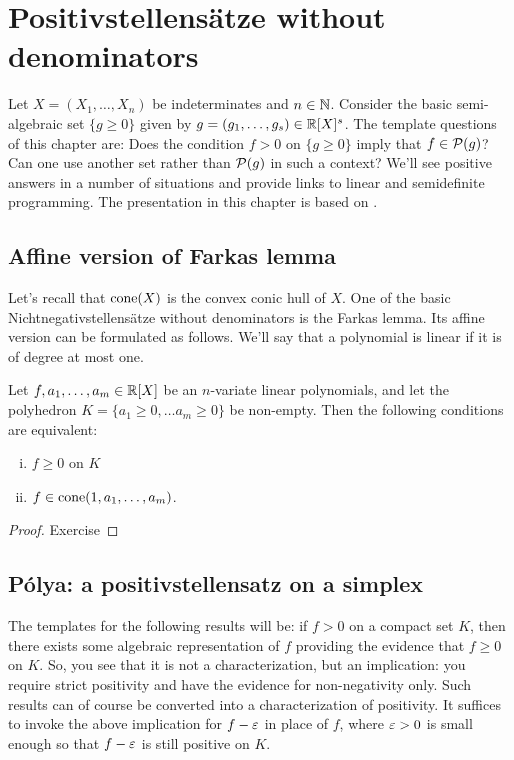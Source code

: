 \section{Positivstellensätze without denominators}

Let $X=(X_1,\ldots,X_n)$ be indeterminates and $n \in \mathbb{N}$. Consider the basic semi-algebraic set $\{g \ge 0\}$ given by $g =(g_1,\ldots,g_s) \in \mathbb{R}[X]^s$.  The template questions of this chapter are: Does the condition $f > 0$ on $\{g \ge 0\}$ imply that $f \in \mathcal{P}(g)$? Can one use another set rather than $\mathcal{P}(g)$ in such a context? We'll see positive answers in a number of situations and provide links to linear and semidefinite programming.
The presentation in this chapter is based on \cite{averkov2013constructive}.

\subsection{Affine version of Farkas lemma}

Let's recall that $\operatorname{cone}(X)$ is the convex conic hull of $X$. One of the basic Nichtnegativstellens\"atze without denominators is the Farkas lemma. Its affine version can be formulated as follows. We'll say that a polynomial is linear if it is of degree at most one. 

\begin{lemma}
	\label{lem:farkas}
	Let $f,a_1,\ldots,a_m \in \mathbb{R}[X]$ be an $n$-variate linear polynomials, and let the polyhedron $K = \{a_1 \ge 0,\ldots a_m \ge 0\}$ be non-empty.
	Then the following conditions are equivalent:
	\begin{enumerate}[(i)]
		\item $f \ge 0$ on $K$
		\item $f \in \operatorname{cone}(1,a_1,\ldots,a_m)$. 
	\end{enumerate}
\end{lemma}
\begin{proof}
	Exercise
\end{proof}


\subsection{P\'olya: a positivstellensatz on a simplex}

The templates for the following results will be: if $f > 0$ on a compact set $K$, then there exists some algebraic representation of $f$ providing the evidence that $f \ge 0$ on $K$. So, you see that it is not a characterization, but an implication: you require strict positivity and have the evidence for non-negativity only. Such results can of course be converted into a characterization of positivity. It suffices to invoke the above implication for $f - {\operatorname{\varepsilon}}$ in place of $f$, where ${\operatorname{\varepsilon}}>0$ is small enough so that $f - {\operatorname{\varepsilon}}$ is still positive on $K$. 


